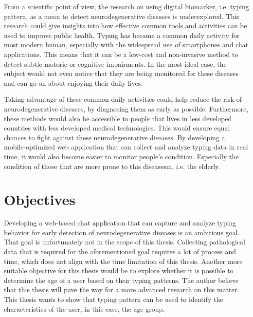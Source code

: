 From a scientific point of view, the research on using digital biomarker, i.e. typing pattern, as a mean to detect neurodegenerative diseases is underexplored.
This research could give insights into how effective common tools and activities can be used to improve public health.
Typing has became a common daily activity for most modern human, especially with the widespread use of smartphones and chat applications.
This means that it can be a low-cost and non-invasive method to detect subtle motoric or cognitive impairments.
In the most ideal case, the subject would not even notice that they are being monitored for these diseases and can go on about enjoying their daily lives.

Taking advantage of these common daily activities could help reduce the risk of neurodegenerative diseases, by diagnosing them as early as possible.
Furthermore, these methods would also be accessible to people that lives in less developed countries with less developed medical technologies.
This would ensure equal chances to fight against these neurodegenerative diseases.
By developing a mobile-optimized web application that can collect and analyze typing data in real time, it would also become easier to monitor people's condition.
Especially the condition of those that are more prone to this diseasesm, i.e. the elderly.

\section{Objectives}


Developing a web-based chat application that can capture and analyze typing behavior for early detection of neurodegenerative diseases is an ambitious goal.
That goal is unfortunately not in the scope of this thesis.
Collecting pathological data that is required for the aforementioned goal requires a lot of process and time, which does not align with the time limitation of this thesis.
Another more suitable objective for this thesis would be to explore whether it is possible to determine the age of a user based on their typing patterns.
The author believe that this thesis will pave the way for a more advanced research on this matter.
This thesis wants to show that typing pattern can be used to identify the characteristics of the user, in this case, the age group.

